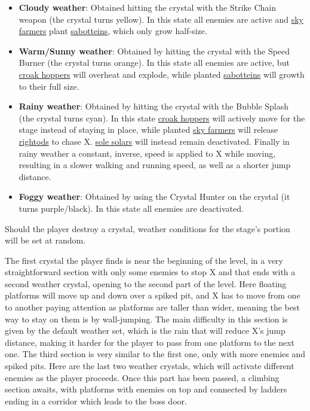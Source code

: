 \begin{itemize}
	\item \textbf{Cloudy weather}: Obtained hitting the crystal with the Strike Chain weapon (the crystal turns yellow). In this state all enemies are active and \hyperlink{enem:Sky_farmer}{sky farmers} plant \hyperlink{enem:Sabottein}{sabotteins}, which only grow half-size.
	\item \textbf{Warm/Sunny weather}: Obtained by hitting the crystal with the Speed Burner (the crystal turns orange). In this state all enemies are active, but \hyperlink{enem:Croak_hopper}{croak hoppers} will overheat and explode, while planted \hyperlink{enem:Sabottein}{sabotteins} will growth to their full size.
	\item \textbf{Rainy weather}: Obtained by hitting the crystal with the Bubble Splash (the crystal turns cyan). In this state \hyperlink{enem:Croak_hopper}{croak hoppers} will actively move for the stage instead of staying in place, while planted \hyperlink{enem:Sky_farmer}{sky farmers} will release \hyperlink{enem:Rightod}{rightods} to chase X. \hyperlink{enem:Sole_solar}{sole solars} will instead remain deactivated. Finally in rainy weather a constant, inverse, speed is applied to X while moving, resulting in a slower walking and running speed, as well as a shorter jump distance.
	\item \textbf{Foggy weather}: Obtained by using the Crystal Hunter on the crystal (it turns purple/black). In this state all enemies are deactivated.
\end{itemize}

Should the player destroy a crystal, weather conditions for the stage's portion will be set at random.

The first crystal the player finds is near the beginning of the level, in a very straightforward section with only some enemies to stop X and that ends with a second weather crystal, opening to the second part of the level. Here floating platforms will move up and down over a spiked pit, and X has to move from one to another paying attention as platforms are taller than wider, meaning the best way to stay on them is by wall-jumping. The main difficulty in this section is given by the default weather set, which is the rain that will reduce X's jump distance, making it harder for the player to pass from one platform to the next one. The third section is very similar to the first one, only with more enemies and spiked pits. Here are the last two weather crystals, which will activate different enemies as the player proceeds. Once this part has been passed, a climbing section awaits, with platforms with enemies on top and connected by ladders ending in a corridor which leads to the boss door.

